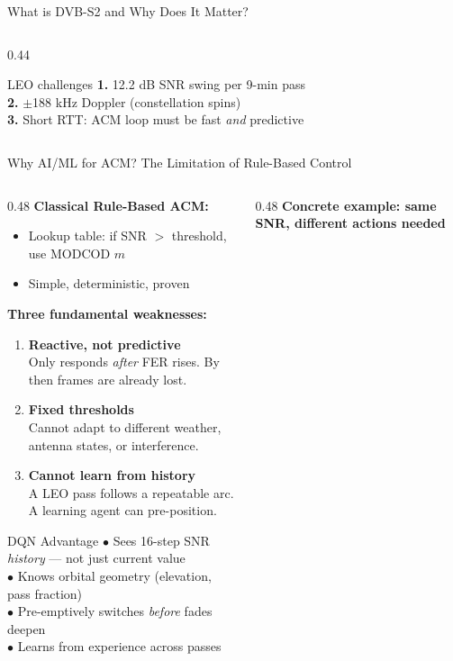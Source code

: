 \documentclass[aspectratio=169,10pt]{beamer}
\begin{document}
\begin{frame}[shrink=15]{What is DVB-S2 and Why Does It Matter?}
\begin{columns}[T]
\begin{column}{0.44\textwidth}
      \vspace{0.5em}
      \begin{alertblock}{\scriptsize LEO challenges}
        \scriptsize
        \textbf{1.} 12.2 dB SNR swing per 9-min pass\\
        \textbf{2.} $\pm$188 kHz Doppler (constellation spins)\\
        \textbf{3.} Short RTT: ACM loop must be fast \emph{and} predictive
      \end{alertblock}
    \end{column}
  \end{columns}
\end{frame}

\begin{frame}[shrink=5]{Why AI/ML for ACM? The Limitation of Rule-Based Control}
  \begin{columns}[T]
    \begin{column}{0.48\textwidth}
      \textbf{Classical Rule-Based ACM:}
      \begin{itemize}\scriptsize
        \item Lookup table: if SNR $>$ threshold, use MODCOD $m$
        \item Simple, deterministic, proven
      \end{itemize}
      \vspace{0.3em}
      \textbf{Three fundamental weaknesses:}
      \begin{enumerate}\scriptsize
        \item \textbf{Reactive, not predictive}\\
              Only responds \emph{after} FER rises. By then frames are already lost.
        \item \textbf{Fixed thresholds}\\
              Cannot adapt to different weather, antenna states, or interference.
        \item \textbf{Cannot learn from history}\\
              A LEO pass follows a repeatable arc. A learning agent can pre-position.
      \end{enumerate}
      \vspace{0.3em}
      \begin{keybox}{DQN Advantage}
        \scriptsize
        $\bullet$ Sees 16-step SNR \emph{history} — not just current value\\
        $\bullet$ Knows orbital geometry (elevation, pass fraction)\\
        $\bullet$ Pre-emptively switches \emph{before} fades deepen\\
        $\bullet$ Learns from experience across passes
      \end{keybox}
    \end{column}
    \begin{column}{0.48\textwidth}
      \textbf{Concrete example: same SNR, different actions needed}
      \vspace{0.3em}


\end{column}
\end{columns}
\end{frame}
\end{document}
